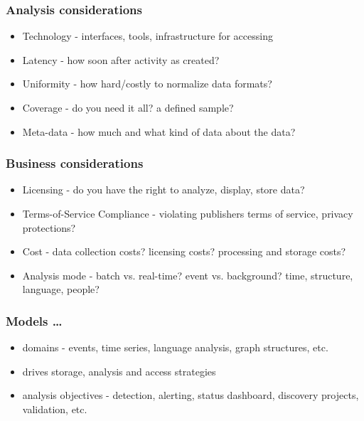 \documentclass{beamer}
\begin{document}
\begin{frame}\frametitle{Analysis considerations}
{\Large
\begin{itemize}
\item Technology - interfaces, tools, infrastructure for accessing
\item Latency - how soon after activity as created?
\item Uniformity - how hard/costly to normalize data formats?
\item Coverage - do you need it all? a defined sample?
\item Meta-data -  how much and what kind of data about the data?
\end{itemize}
}
\end{frame}


\begin{frame}\frametitle{Business considerations}
{\Large
\begin{itemize}
\item Licensing - do you have the right to analyze, display, store data?
\item Terms-of-Service Compliance - violating publishers terms of service, privacy protections?
\item Cost - data collection costs? licensing costs? processing and storage costs?
\item Analysis mode - batch vs. real-time? event vs. background? time, structure, language, people?
\end{itemize}
}
\end{frame}





\begin{frame}\frametitle{Models \ldots}
{\Large
\begin{itemize}
\item domains - events, time series, language analysis, graph structures, etc.
\item drives storage, analysis and access strategies
\item analysis objectives - detection, alerting, status dashboard, discovery projects, validation, etc.
\end{itemize}
}
\end{frame}

\end{document}
